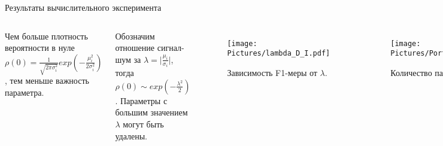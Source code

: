 \documentclass{beamer}
\begin{document}
\begin{frame}{Результаты вычислительного эксперимента}
	
\begin{columns}
	\column{6.2cm}
	
	
	Чем больше плотность вероятности в нуле $\rho(0)=\frac{1}{\sqrt{2\pi\sigma_i^2}}exp(-\frac{\mu_i^2}{2\sigma_i^2})$, тем меньше важность параметра.

	Обозначим отношение сигнал-шум за $\lambda = \big|\frac{\mu_i}{\sigma_i}\big|$, тогда $\rho(0) \sim exp(-\frac{\lambda^2}{2})$.
	Параметры с большим значением $\lambda$ могут быть удалены.
	
	\vspace{-0.00cm}
	
	\begin{figure}
	\texttt{[image: Pictures/lambda\_D\_I.pdf]}
	\vspace{-0.45cm}
	\caption*{Зависимость F1-меры от $\lambda$.}
	\end{figure}
	

	
	\column{5.6cm}

	\vspace{-0.65cm}
	\begin{figure}
	\texttt{[image: Pictures/Portion\_of\_pruned\_weights\_on\_lambda\_D\_I.pdf]}
	\vspace{-0.45cm}	
	\caption*{Количество параметров от $\lambda$.}
	\end{figure}
	
	\vspace{-1.27cm}
	
	\begin{figure}
	\texttt{[image: Pictures/pruning\_evidence\_D\_I.pdf]}
	\vspace{-0.45cm}	
	\caption*{Зависимость правдоподобия от $\lambda$.}
	\end{figure}
	
\end{columns}
%
%	
%	
\end{frame}
\end{document}

